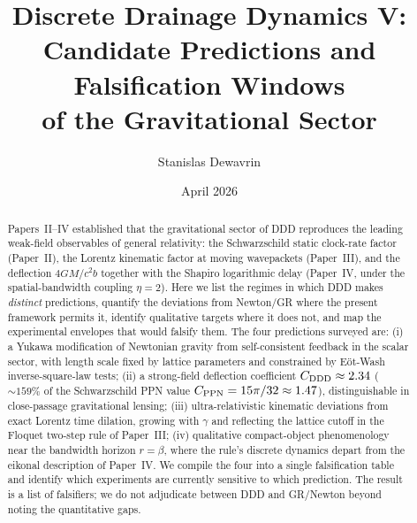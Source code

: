 \documentclass[11pt,a4paper]{article}
\title{\textbf{Discrete Drainage Dynamics V:\\
Candidate Predictions and Falsification Windows\\
of the Gravitational Sector}}
\author[1]{Stanislas Dewavrin}
\affil[1]{Independent researcher \\ \texttt{dewavrin.iphone@gmail.com}}
\date{April 2026}
\begin{document}
\maketitle

\begin{abstract}
\noindent
Papers~II--IV established that the gravitational sector of DDD reproduces
the leading weak-field observables of general relativity: the
Schwarzschild static clock-rate factor (Paper~II), the Lorentz kinematic
factor at moving wavepackets (Paper~III), and the deflection
$4GM/c^2 b$ together with the Shapiro logarithmic delay (Paper~IV, under
the spatial-bandwidth coupling $\eta = 2$). Here we list the regimes in which DDD makes \emph{distinct} predictions, quantify the deviations from Newton/GR where the present framework permits it, identify qualitative targets where it does not, and map the experimental envelopes that would falsify them. The four predictions surveyed are:
(i) a Yukawa modification of Newtonian gravity from self-consistent
feedback in the scalar sector, with length scale fixed by lattice
parameters and constrained by E\"{o}t-Wash inverse-square-law tests;
(ii) a strong-field deflection coefficient $C_{\rm DDD} \approx 2.34$
($\sim 159\%$ of the Schwarzschild PPN value $C_{\rm PPN} = 15\pi/32
\approx 1.47$), distinguishable in close-passage gravitational lensing;
(iii) ultra-relativistic kinematic deviations from exact Lorentz time
dilation, growing with $\gamma$ and reflecting the lattice cutoff in the
Floquet two-step rule of Paper~III;
(iv) qualitative compact-object phenomenology near the bandwidth
horizon $r = \beta$, where the rule's discrete dynamics depart from
the eikonal description of Paper~IV. We compile the four into a single
falsification table and identify which experiments are currently
sensitive to which prediction. The result is a list of falsifiers; we
do not adjudicate between DDD and GR/Newton beyond noting the
quantitative gaps.
\end{abstract}

\noindent{}
\bigskip
\end{document}
